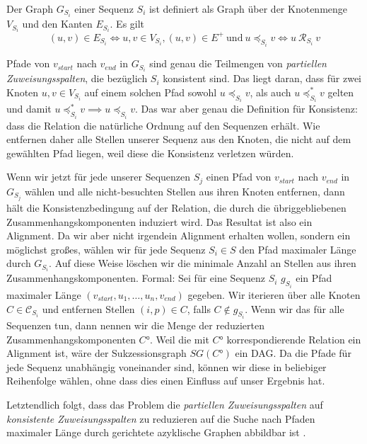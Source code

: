 \begin{definition}
	Der Graph $G_{S_i}$ einer Sequenz $S_i$ ist definiert als Graph über der Knotenmenge $V_{S_i}$ und den Kanten $E_{S_i}$. Es gilt
	\begin{equation}
		(u,v) \in E_{S_i} \Longleftrightarrow u,v \in V_{S_i}, (u,v) \in E^{+}\: \text{und}\: u \preceq_{S_i} v \Longleftrightarrow u\: \mathcal{R}_{S_i}\: v
	\end{equation}
\end{definition}

Pfade von $v_{start}$ nach $v_{end}$ in $G_{S_i}$ sind genau die Teilmengen von \emph{partiellen Zuweisungsspalten}, die bezüglich $S_i$ konsistent sind. Das liegt daran, dass für zwei Knoten $u,v \in V_{S_i}$ auf einem solchen Pfad sowohl $u \preceq_{S_i} v$, als auch $u \preceq_{S_i}^{*} v$ gelten und damit $u \preceq_{S_i}^{*} v \implies u \preceq_{S_i} v$. Das war aber genau die Definition für Konsistenz: dass die Relation die natürliche Ordnung auf den Sequenzen erhält. Wie entfernen daher alle Stellen unserer Sequenz aus den Knoten, die nicht auf dem gewählten Pfad liegen, weil diese die Konsistenz verletzen würden. 

Wenn wir jetzt für jede unserer Sequenzen $S_j$ einen Pfad von $v_{start}$ nach $v_{end}$ in $G_{S_j}$ wählen und alle nicht-besuchten Stellen  aus ihren Knoten entfernen, dann hält die Konsistenzbedingung auf der Relation, die durch die übriggebliebenen Zusammenhangskomponenten induziert wird. Das Resultat ist also ein Alignment. Da wir aber nicht irgendein Alignment erhalten wollen, sondern ein möglichst großes, wählen wir für jede Sequenz $S_i \in S$ den Pfad maximaler Länge durch $G_{S_i}$. Auf diese Weise löschen wir die minimale Anzahl an Stellen aus ihren Zusammenhangskomponenten. Formal: Sei für eine Sequenz $S_i$ $g_{S_i}$ ein Pfad maximaler Länge $(v_{start}, u_1, \dots, u_n, v_{end})$ gegeben. Wir iterieren über alle Knoten $C \in \mathcal{C}_{S_i}$ und entfernen Stellen $(i,p) \in C$, falls $C \notin g_{S_i}$. Wenn wir das für alle Sequenzen tun, dann nennen wir die Menge der reduzierten Zusammenhangskomponenten $C°$. Weil die mit $C°$ korrespondierende Relation ein Alignment ist, wäre der Sukzessionsgraph $SG(C°)$ ein DAG. Da die Pfade für jede Sequenz unabhängig voneinander sind, können wir diese in beliebiger Reihenfolge wählen, ohne dass dies einen Einfluss auf unser Ergebnis hat.

Letztendlich folgt, dass das Problem die \emph{partiellen Zuweisungsspalten} auf \emph{konsistente Zuweisungsspalten} zu reduzieren auf die Suche nach Pfaden maximaler Länge durch gerichtete azyklische Graphen abbildbar ist \citep{cpm10}.


